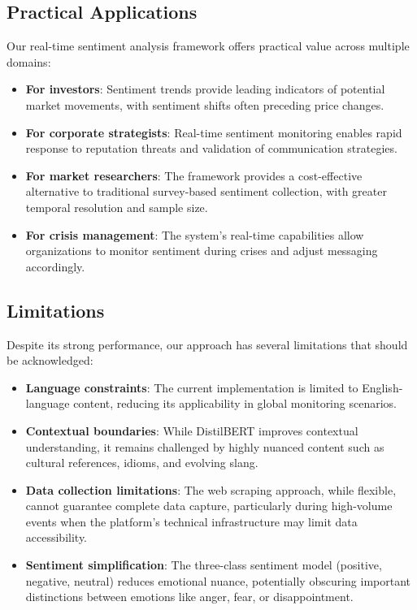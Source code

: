 \documentclass[conference]{IEEEtran}
\begin{document}
\subsection{Practical Applications}

Our real-time sentiment analysis framework offers practical value across multiple domains:

\begin{itemize}
    \item \textbf{For investors}: Sentiment trends provide leading indicators of potential market movements, with sentiment shifts often preceding price changes.
    
    \item \textbf{For corporate strategists}: Real-time sentiment monitoring enables rapid response to reputation threats and validation of communication strategies.
    
    \item \textbf{For market researchers}: The framework provides a cost-effective alternative to traditional survey-based sentiment collection, with greater temporal resolution and sample size.
    
    \item \textbf{For crisis management}: The system's real-time capabilities allow organizations to monitor sentiment during crises and adjust messaging accordingly.
\end{itemize}

\subsection{Limitations}

Despite its strong performance, our approach has several limitations that should be acknowledged:

\begin{itemize}
    \item \textbf{Language constraints}: The current implementation is limited to English-language content, reducing its applicability in global monitoring scenarios.
    
    \item \textbf{Contextual boundaries}: While DistilBERT improves contextual understanding, it remains challenged by highly nuanced content such as cultural references, idioms, and evolving slang.
    
    \item \textbf{Data collection limitations}: The web scraping approach, while flexible, cannot guarantee complete data capture, particularly during high-volume events when the platform's technical infrastructure may limit data accessibility.
    
    \item \textbf{Sentiment simplification}: The three-class sentiment model (positive, negative, neutral) reduces emotional nuance, potentially obscuring important distinctions between emotions like anger, fear, or disappointment.
\end{itemize}
\end{document}
